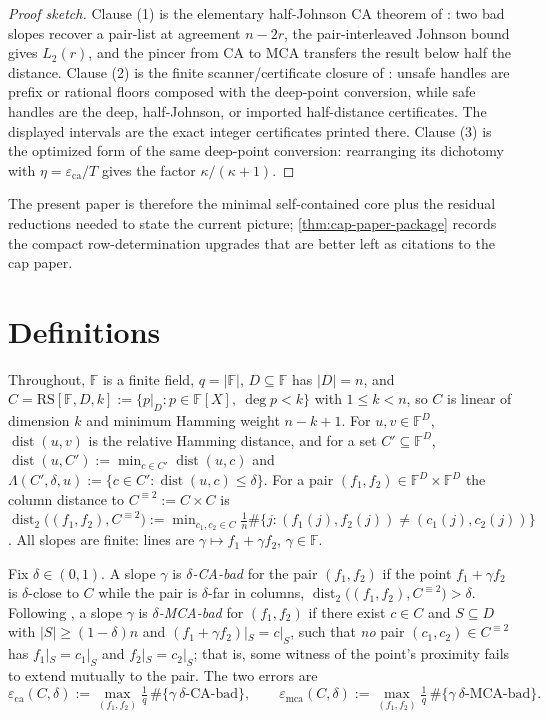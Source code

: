 \documentclass[11pt]{amsart}
\theoremstyle{definition}
\theoremstyle{remark}
\newcommand{\F}{\mathbb{F}}
\newcommand{\RS}{\mathrm{RS}}
\newcommand{\dist}{\operatorname{dist}}
\newcommand{\eca}{\varepsilon_{\mathrm{ca}}}
\newcommand{\emca}{\varepsilon_{\mathrm{mca}}}
\newcommand{\Lst}{\Lambda}
\begin{document}
\begin{proof}[Proof sketch]
Clause \textup{(1)} is the elementary half-Johnson CA theorem of \cite{Cho26b}: two bad slopes recover a pair-list at agreement $n-2r$, the pair-interleaved Johnson bound gives $L_2(r)$, and the pincer from CA to MCA transfers the result below half the distance. Clause \textup{(2)} is the finite scanner/certificate closure of \cite{Cho26b}: unsafe handles are prefix or rational floors composed with the deep-point conversion, while safe handles are the deep, half-Johnson, or imported half-distance certificates. The displayed intervals are the exact integer certificates printed there. Clause \textup{(3)} is the optimized form of the same deep-point conversion: rearranging its dichotomy with $\eta=\eca/T$ gives the factor $\kappa/(\kappa+1)$.
\end{proof}

The present paper is therefore the minimal self-contained core plus the residual reductions needed to state the current picture; \cref{thm:cap-paper-package} records the compact row-determination upgrades that are better left as citations to the cap paper.

\section{Definitions}\label{sec:defs}

Throughout, $\F$ is a finite field, $q=|\F|$, $D\subseteq\F$ has $|D|=n$, and $C=\RS[\F,D,k]:=\{p|_D:p\in\F[X],\ \deg p<k\}$ with $1\le k<n$, so $C$ is linear of dimension $k$ and minimum Hamming weight $n-k+1$. For $u,v\in\F^D$, $\dist(u,v)$ is the relative Hamming distance, and for a set $C'\subseteq\F^D$, $\dist(u,C'):=\min_{c\in C'}\dist(u,c)$ and $\Lst(C',\delta,u):=\{c\in C':\dist(u,c)\le\delta\}$. For a pair $(f_1,f_2)\in\F^D\times\F^D$ the column distance to $C^{\equiv2}:=C\times C$ is $\dist_2\bigl((f_1,f_2),C^{\equiv2}\bigr):=\min_{c_1,c_2\in C}\frac1n\#\{j:(f_1(j),f_2(j))\ne(c_1(j),c_2(j))\}$. All slopes are finite: lines are $\gamma\mapsto f_1+\gamma f_2$, $\gamma\in\F$.

Fix $\delta\in(0,1)$. A slope $\gamma$ is \emph{$\delta$-CA-bad} for the pair $(f_1,f_2)$ if the point $f_1+\gamma f_2$ is $\delta$-close to $C$ while the pair is $\delta$-far in columns, $\dist_2\bigl((f_1,f_2),C^{\equiv2}\bigr)>\delta$. Following \cite[Defs.~4.1, 4.3]{ABF26}, a slope $\gamma$ is \emph{$\delta$-MCA-bad} for $(f_1,f_2)$ if there exist $c\in C$ and $S\subseteq D$ with $|S|\ge(1-\delta)n$ and $(f_1+\gamma f_2)|_S=c|_S$, such that \emph{no} pair $(c_1,c_2)\in C^{\equiv2}$ has $f_1|_S=c_1|_S$ and $f_2|_S=c_2|_S$; that is, some witness of the point's proximity fails to extend mutually to the pair. The two errors are
\[
\eca(C,\delta):=\max_{(f_1,f_2)}\tfrac1q\,\#\{\gamma\ \text{$\delta$-CA-bad}\},
\qquad
\emca(C,\delta):=\max_{(f_1,f_2)}\tfrac1q\,\#\{\gamma\ \text{$\delta$-MCA-bad}\}.
\]
\end{document}
